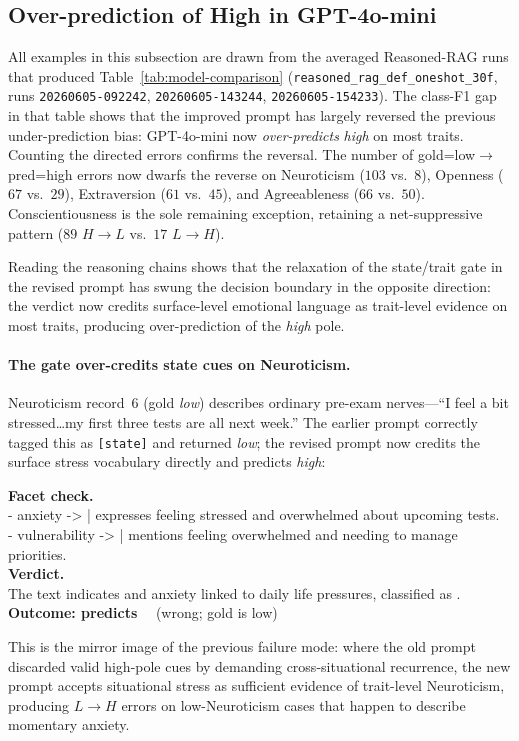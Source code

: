 \documentclass[../main.tex]{subfiles}
\begin{document}
\subsection{Over-prediction of High in GPT-4o-mini}
\label{sec:qual-gpt}

All examples in this subsection are drawn from the averaged Reasoned-RAG runs
that produced Table~\ref{tab:model-comparison}
(\texttt{reasoned\_rag\_def\_oneshot\_30f}, runs \texttt{20260605-092242},
\texttt{20260605-143244}, \texttt{20260605-154233}).
The class-F1 gap in that table shows that the improved prompt has largely
reversed the previous under-prediction bias: GPT-4o-mini now \textit{over-predicts}
\textit{high} on most traits.
Counting the directed errors confirms the reversal. The number of
\mbox{gold=low$\rightarrow$pred=high} errors now dwarfs the reverse on
Neuroticism ($103$ vs.\ $8$), Openness ($67$ vs.\ $29$), Extraversion ($61$
vs.\ $45$), and Agreeableness ($66$ vs.\ $50$). Conscientiousness is the
sole remaining exception, retaining a net-suppressive pattern ($89$
$H{\to}L$ vs.\ $17$ $L{\to}H$).

Reading the reasoning chains shows that the relaxation of the state/trait gate
in the revised prompt has swung the decision boundary in the opposite direction:
the verdict now credits surface-level emotional language as trait-level evidence
on most traits, producing over-prediction of the \textit{high} pole.

\paragraph{The gate over-credits state cues on Neuroticism.}
Neuroticism record~6 (gold \textit{low}) describes ordinary pre-exam
nerves---``I feel a bit stressed\dots my first three tests are all next week.''
The earlier prompt correctly tagged this as \texttt{[state]} and returned
\textit{low}; the revised prompt now credits the surface stress vocabulary
directly and predicts \textit{high}:
%
\begin{llmbox}[title={Record 6 -- Neuroticism (gold: low)}]
\textbf{Facet check.}\\
- anxiety ->  | expresses feeling stressed and overwhelmed about upcoming tests.\\
- vulnerability ->  | mentions feeling overwhelmed and needing to manage priorities.\\[4pt]
\textbf{Verdict.}\\
The text indicates  and anxiety linked to
daily life pressures, classified as .\\[4pt]
\textbf{Outcome: predicts } ~~(wrong; gold is low)
\end{llmbox}
%
This is the mirror image of the previous failure mode: where the old prompt
discarded valid high-pole cues by demanding cross-situational recurrence, the
new prompt accepts situational stress as sufficient evidence of trait-level
Neuroticism, producing $L{\to}H$ errors on low-Neuroticism cases that
happen to describe momentary anxiety.
\end{document}
